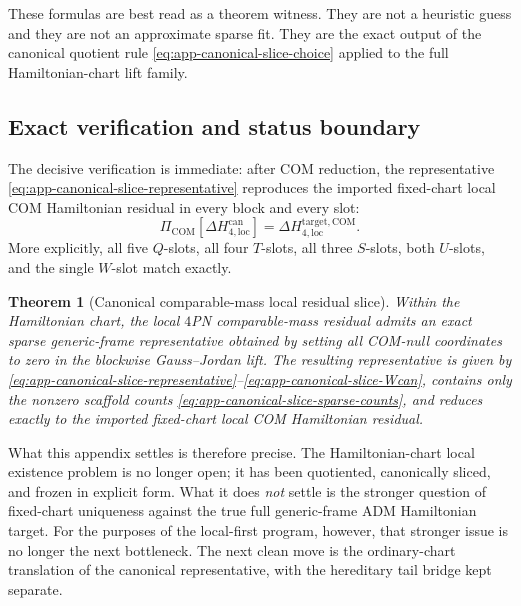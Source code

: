 \documentclass[11pt]{article}
\newtheorem{theorem}{Theorem}
\begin{document}
These formulas are best read as a theorem witness.  They are not a heuristic
guess and they are not an approximate sparse fit.  They are the exact output of
the canonical quotient rule \eqref{eq:app-canonical-slice-choice} applied to the
full Hamiltonian-chart lift family.

\subsection{Exact verification and status boundary}
\label{app:canonical-slice-verification}

The decisive verification is immediate: after COM reduction, the representative
\eqref{eq:app-canonical-slice-representative} reproduces the imported fixed-chart
local COM Hamiltonian residual in every block and every slot:
\begin{equation}
\Pi_{\mathrm{COM}}\!\left[\Delta H_{4,\mathrm{loc}}^{\mathrm{can}}\right]
=
\Delta H_{4,\mathrm{loc}}^{\mathrm{target,COM}}.
\label{eq:app-canonical-slice-referee-identity}
\end{equation}
More explicitly, all five \(Q\)-slots, all four \(T\)-slots, all three
\(S\)-slots, both \(U\)-slots, and the single \(W\)-slot match exactly.

\begin{theorem}[Canonical comparable-mass local residual slice]
\label{thm:app-canonical-slice}
Within the Hamiltonian chart, the local $4$PN comparable-mass residual admits an
exact sparse generic-frame representative obtained by setting all COM-null
coordinates to zero in the blockwise Gauss--Jordan lift.  The resulting
representative is given by
\eqref{eq:app-canonical-slice-representative}--\eqref{eq:app-canonical-slice-Wcan},
contains only the nonzero scaffold counts
\eqref{eq:app-canonical-slice-sparse-counts}, and reduces exactly to the
imported fixed-chart local COM Hamiltonian residual.
\end{theorem}

What this appendix settles is therefore precise.  The Hamiltonian-chart local
existence problem is no longer open; it has been quotiented, canonically sliced,
and frozen in explicit form.  What it does \emph{not} settle is the stronger
question of fixed-chart uniqueness against the true full generic-frame ADM
Hamiltonian target.  For the purposes of the local-first program, however, that
stronger issue is no longer the next bottleneck.  The next clean move is the
ordinary-chart translation of the canonical representative, with the hereditary
tail bridge kept separate.
\end{document}
